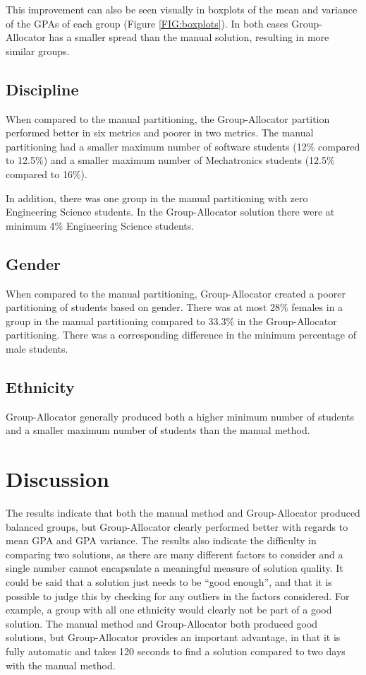 \documentclass[12pt]{ORSNZ}
\begin{document}
This improvement can also be seen visually in boxplots of the mean and variance of the GPAs of each group (Figure \ref{FIG:boxplots}). In both cases Group-Allocator has a smaller spread than the manual solution, resulting in more similar groups.

\subsection{Discipline}
When compared to the manual partitioning, the Group-Allocator partition performed better in six metrics and poorer in two metrics. The manual partitioning had a smaller maximum number of software students (12\% compared to 12.5\%) and a smaller maximum number of Mechatronics students (12.5\% compared to 16\%). 

In addition, there was one group in the manual partitioning with zero Engineering Science students. In the Group-Allocator solution there were at minimum 4\% Engineering Science students.

\subsection{Gender}
When compared to the manual partitioning, Group-Allocator created a poorer partitioning of students based on gender. There was at most 28\% females in a group in the manual partitioning compared to 33.3\% in the Group-Allocator partitioning. There was a corresponding difference in the minimum percentage of male students.

\subsection{Ethnicity}

Group-Allocator generally produced both a higher minimum number of students and a smaller maximum number of students than the manual method.

\section{Discussion}
The results indicate that both the manual method and Group-Allocator produced balanced groups, but Group-Allocator clearly performed better with regards to mean GPA and GPA variance. The results also indicate the difficulty in comparing two solutions, as there are many different factors to consider and a single number cannot encapsulate a meaningful measure of solution quality. It could be said that a solution just needs to be ``good enough'', and that it is possible to judge this by checking for any outliers in the factors considered. For example, a group with all one ethnicity would clearly not be part of a good solution. The manual method and Group-Allocator both produced good solutions, but Group-Allocator provides an important advantage, in that it is fully automatic and takes 120 seconds to find a solution compared to two days with the manual method.
\end{document}

